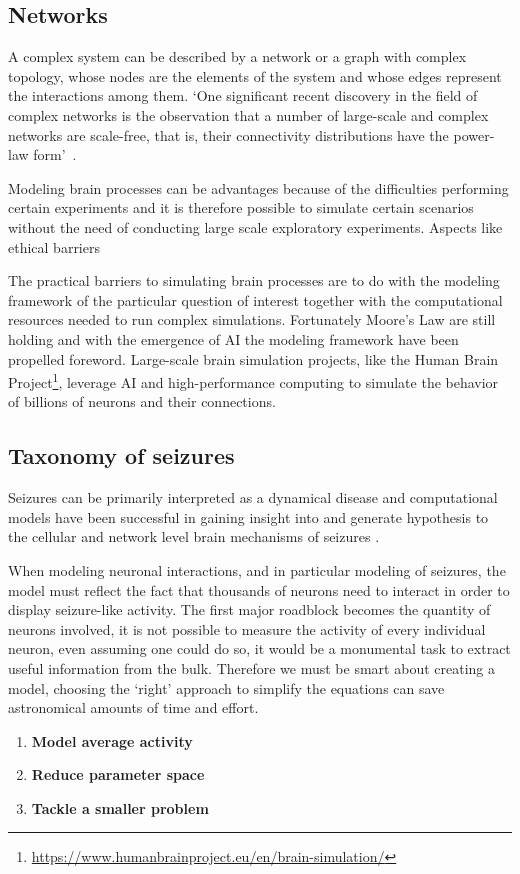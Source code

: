 \documentclass[../../Orator.tex]{subfiles}
\begin{document}
\subsection*{Networks}
A complex system can be described by a network or a graph with complex topology, whose nodes are the elements of the system and whose edges represent the interactions among them. `One significant recent discovery in the field of complex networks is the observation that a number of large-scale and complex networks are scale-free, that is, their connectivity distributions have the
power-law form'~\cite{wang2002synchronization}.

Modeling brain processes can be advantages because of the difficulties  performing certain experiments and it is therefore possible to simulate certain scenarios without the need of conducting large scale exploratory experiments. Aspects like ethical barriers

The practical barriers to simulating brain processes are to do with the modeling framework of the particular question of interest together with the computational resources needed to run complex simulations. Fortunately Moore's Law are still holding and with the emergence of AI the modeling framework have been propelled foreword. Large-scale brain simulation projects, like the Human Brain Project\footnote{\url{https://www.humanbrainproject.eu/en/brain-simulation/}}, leverage AI and high-performance computing to simulate the behavior of billions of neurons and their connections.


\subsection*{Taxonomy of seizures}

Seizures can be primarily interpreted as a dynamical disease \cite{da2003epilepsies, milton2010epilepsy} and computational models have been successful in gaining insight into and generate hypothesis to the cellular and network level brain mechanisms of seizures \cite{bazhenov2008cellular}.




When modeling neuronal interactions, and in particular modeling of seizures, the model must reflect the fact that thousands of neurons need to interact in order to display seizure-like activity. 
The first major roadblock becomes the quantity of neurons involved, it is not possible to measure the activity of every individual neuron, even assuming one could do so, it would be a monumental task to extract useful information from the bulk. 
Therefore we must be smart about creating a model, choosing the `right' approach to simplify the equations can save astronomical amounts of time and effort.
\begin{enumerate}
    \item \textbf{Model average activity}
    \item \textbf{Reduce parameter space}
    \item \textbf{Tackle a smaller problem}
\end{enumerate}
\end{document}

